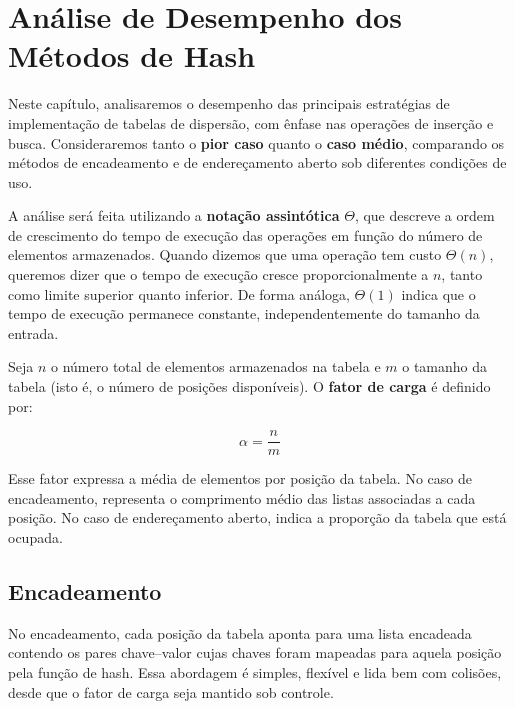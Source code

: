 \chapter{Análise de Desempenho dos Métodos de Hash}

Neste capítulo, analisaremos o desempenho das principais estratégias de implementação de tabelas de dispersão, com ênfase nas operações de inserção e busca. 
Consideraremos tanto o \textbf{pior caso} quanto o \textbf{caso médio}, comparando os métodos de encadeamento e de endereçamento aberto sob diferentes condições de uso.

A análise será feita utilizando a \textbf{notação assintótica} $\Theta$, que descreve a ordem de crescimento do tempo de execução das operações em função do número de elementos armazenados. 
Quando dizemos que uma operação tem custo $\Theta(n)$, queremos dizer que o tempo de execução cresce proporcionalmente a $n$, tanto como limite superior quanto inferior. 
De forma análoga, $\Theta(1)$ indica que o tempo de execução permanece constante, independentemente do tamanho da entrada.

\begin{center}
\noindent{}
\end{center}

Seja $n$ o número total de elementos armazenados na tabela e $m$ o tamanho da tabela (isto é, o número de posições disponíveis). 
O \textbf{fator de carga} é definido por:

\[
\alpha = \frac{n}{m}
\]

Esse fator expressa a média de elementos por posição da tabela. 
No caso de encadeamento, representa o comprimento médio das listas associadas a cada posição. 
No caso de endereçamento aberto, indica a proporção da tabela que está ocupada.

\section{Encadeamento}

No encadeamento, cada posição da tabela aponta para uma lista encadeada contendo os pares chave–valor cujas chaves foram mapeadas para aquela posição pela função de hash. Essa abordagem é simples, flexível e lida bem com colisões, desde que o fator de carga seja mantido sob controle.

